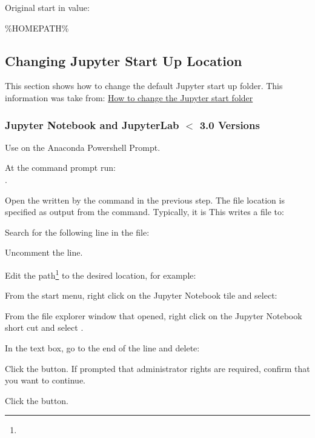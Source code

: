 \noindent Original start in value:
	\begin{code}[\codenumbering]{}
		\codeitemnonumber \%HOMEPATH\%
	\end{code}


	\subsection{Changing Jupyter Start Up Location}
This section shows how to change the default Jupyter start up folder.  This information was take from:
\href{https://stackoverflow.com/questions/35254852/how-to-change-the-jupyter-start-up-folder}{How to change the Jupyter start folder}

	\subsubsection{Jupyter Notebook and JupyterLab \texorpdfstring{$<$}{<} 3.0 Versions}
	\begin{numberedlist}
		\item Use  on the Anaconda Powershell Prompt.
		\item At the command prompt run:\\ . \label{nl:jupyterstartupfoldergenerateconfiguration}
		\item Open the written by the command in the previous step.  The file location is specified as output from the command.  Typically, it is This writes a file to:\\  \label{nl:jupyterstartupfolderconfigurationfile}
		\item Search for the following line in the file:\\  \label{nl:jupyterstartupfoldersearchforline}
		\item Uncomment the line.
		\item Edit the path\footnote{} to the desired location, for example:\\   \label{nl:jupyterstartupfoldereditpath}
		\item From the start menu, right click on the Jupyter Notebook tile and select:\\ 
		\item From the file explorer window that opened, right click on the Jupyter Notebook short cut and select .
		\item In the  text box, go to the end of the line and delete:\\ 
		\item Click the  button.  If prompted that administrator rights are required, confirm that you want to continue.
		\item Click the  button.
	\end{numberedlist}

